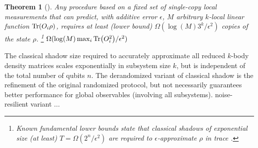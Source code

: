 \documentclass[
reprint,
aps,
pra,
floatfix,
]{revtex4-2}
\theoremstyle{plain}
\newtheorem{theorem}{Theorem}
\theoremstyle{definition}
\newcommand{\ob}{O}
\newcommand{\dm}{\rho}
\newcommand{\ghz}{\text{GHZ}}
\begin{document}
\begin{theorem}[\cite{huangPredictingManyProperties2020}]\label{thm:classical_shadow}
	Any procedure based on a fixed set of single-copy local measurements that can predict,
	with additive error $\epsilon$, $M$ arbitrary $k$-local linear function $\Tr(\ob_i\dm)$,
	requires at least (lower bound)
	$\Omega(\log(M) 3^k/\epsilon^2)$ copies of the state $\dm$.
	\footnote{Known fundamental lower bounds state that classical shadows of exponential size (at least) $T = \Omega( 2^n / \epsilon^2)$ are required to $\epsilon$-approximate $\dm$ in trace .}
	$\Omega(\log(M) \max_i\Tr(\ob_i^2)/\epsilon^2)$ 
\end{theorem}


The classical shadow size required to accurately approximate all reduced $k$-body density matrices scales exponentially in subsystem size $k$, but is independent of the total number of qubits $n$.
The derandomized variant of classical shadow \cite{huangEfficientEstimationPauli2021} is the refinement of the original randomized protocol, 
but not necessarily guarantees better performance for global observables (involving all subsystems).  
noise-resilient variant \cite{chenRobustShadowEstimation2021} ...


\end{document}
